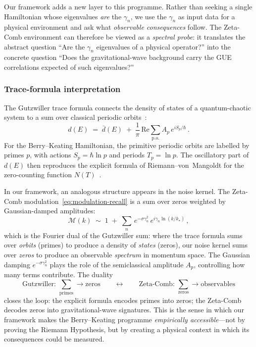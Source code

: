 \documentclass[12pt,a4paper]{article}
\begin{document}
Our framework adds a new layer to this programme.
Rather than seeking a single Hamiltonian whose eigenvalues
\emph{are} the $\gamma_{n}$, we use the $\gamma_{n}$ as
input data for a physical environment and ask what
\emph{observable consequences} follow.
The Zeta-Comb environment can therefore be viewed as a
\emph{spectral probe}: it translates the abstract question
``Are the $\gamma_{n}$ eigenvalues of a physical operator?''
into the concrete question ``Does the gravitational-wave
background carry the GUE correlations expected of such
eigenvalues?''

\subsubsection{Trace-formula interpretation}

The Gutzwiller trace formula connects the density of states
of a quantum-chaotic system to a sum over classical periodic
orbits~\cite{Gutzwiller1971}:
%
\begin{equation}
  d(E)
  \;=\;
  \bar{d}(E)
  \;+\;
  \frac{1}{\pi}\,\mathrm{Re}
  \sum_{\mathrm{p.o.}}
  A_{p}\,e^{iS_{p}/\hbar}\,.
  \label{eq:gutzwiller}
\end{equation}
%
For the Berry--Keating Hamiltonian, the primitive periodic
orbits are labelled by primes $p$, with actions
$S_{p} = \hbar\ln p$ and periods $T_{p} = \ln p$.
The oscillatory part of $d(E)$ then reproduces the explicit
formula of Riemann--von~Mangoldt for the zero-counting
function $N(T)$~\cite{Edwards1974}.

In our framework, an analogous structure appears in the
noise kernel.
The Zeta-Comb modulation~\eqref{eq:modulation-recall} is a
sum over zeros weighted by Gaussian-damped amplitudes:
%
\begin{equation}
  \mathcal{M}(k)
  \;\sim\;
  1 \;+\;
  \sum_{n}\,e^{-\sigma\gamma_{n}^{2}}\,
  e^{i\gamma_{n}\ln(k/k_{\star})}\,,
  \label{eq:noise-trace}
\end{equation}
%
which is the Fourier dual of the Gutzwiller sum: where the
trace formula sums over \emph{orbits} (primes) to produce a
density of \emph{states} (zeros), our noise kernel sums over
\emph{zeros} to produce an observable \emph{spectrum} in
momentum space.
The Gaussian damping $e^{-\sigma\gamma_{n}^{2}}$ plays the
role of the semiclassical amplitude $A_{p}$, controlling how
many terms contribute.
The duality
%
\begin{equation}
  \text{Gutzwiller: }
  \sum_{\text{primes}} \to \text{zeros}
  \qquad\longleftrightarrow\qquad
  \text{Zeta-Comb: }
  \sum_{\text{zeros}} \to \text{observables}
  \label{eq:duality}
\end{equation}
%
closes the loop: the explicit formula encodes primes into zeros;
the Zeta-Comb decodes zeros into gravitational-wave signatures.
This is the sense in which our framework makes the
Berry--Keating programme \emph{empirically accessible}---not
by proving the Riemann Hypothesis, but by creating a physical
context in which its consequences could be measured.
\end{document}
